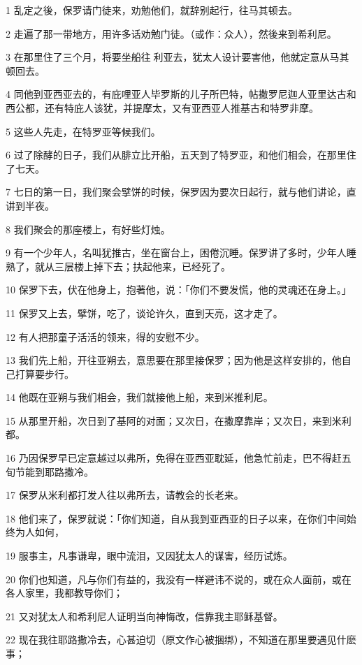 \par 1 乱定之後，保罗请门徒来，劝勉他们，就辞别起行，往马其顿去。
\par 2 走遍了那一带地方，用许多话劝勉门徒。（或作：众人），然後来到希利尼。
\par 3 在那里住了三个月，将要坐船往利亚去，犹太人设计要害他，他就定意从马其顿回去。
\par 4 同他到亚西亚去的，有庇哩亚人毕罗斯的儿子所巴特，帖撒罗尼迦人亚里达古和西公都，还有特庇人该犹，并提摩太，又有亚西亚人推基古和特罗非摩。
\par 5 这些人先走，在特罗亚等候我们。
\par 6 过了除酵的日子，我们从腓立比开船，五天到了特罗亚，和他们相会，在那里住了七天。
\par 7 七日的第一日，我们聚会擘饼的时候，保罗因为要次日起行，就与他们讲论，直讲到半夜。
\par 8 我们聚会的那座楼上，有好些灯烛。
\par 9 有一个少年人，名叫犹推古，坐在窗台上，困倦沉睡。保罗讲了多时，少年人睡熟了，就从三层楼上掉下去；扶起他来，已经死了。
\par 10 保罗下去，伏在他身上，抱著他，说：「你们不要发慌，他的灵魂还在身上。」
\par 11 保罗又上去，擘饼，吃了，谈论许久，直到天亮，这才走了。
\par 12 有人把那童子活活的领来，得的安慰不少。
\par 13 我们先上船，开往亚朔去，意思要在那里接保罗；因为他是这样安排的，他自己打算要步行。
\par 14 他既在亚朔与我们相会，我们就接他上船，来到米推利尼。
\par 15 从那里开船，次日到了基阿的对面；又次日，在撒摩靠岸；又次日，来到米利都。
\par 16 乃因保罗早已定意越过以弗所，免得在亚西亚耽延，他急忙前走，巴不得赶五旬节能到耶路撒冷。
\par 17 保罗从米利都打发人往以弗所去，请教会的长老来。
\par 18 他们来了，保罗就说：「你们知道，自从我到亚西亚的日子以来，在你们中间始终为人如何，
\par 19 服事主，凡事谦卑，眼中流泪，又因犹太人的谋害，经历试炼。
\par 20 你们也知道，凡与你们有益的，我没有一样避讳不说的，或在众人面前，或在各人家里，我都教导你们；
\par 21 又对犹太人和希利尼人证明当向神悔改，信靠我主耶稣基督。
\par 22 现在我往耶路撒冷去，心甚迫切（原文作心被捆绑），不知道在那里要遇见什麽事；
